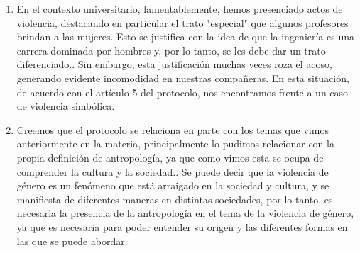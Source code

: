 \documentclass[12pt, a4paper]{article}
\begin{document}
\begin{enumerate}
      \item En el contexto universitario, lamentablemente, hemos presenciado actos de violencia, destacando en particular el trato "especial" que algunos profesores brindan a las mujeres. Esto se justifica con la idea de que la ingeniería es una carrera dominada por hombres y, por lo tanto, se les debe dar un trato diferenciado.. Sin embargo, esta justificación muchas veces roza el acoso, generando evidente incomodidad en nuestras compañeras. En esta situación, de acuerdo con el artículo 5 del protocolo, nos encontramos frente a un caso de violencia simbólica.

      \item Creemos que el protocolo se relaciona en parte con los temas que vimos anteriormente en la materia, principalmente lo pudimos relacionar con la propia definición de antropología, ya que como vimos esta se ocupa de comprender la cultura y la sociedad.. Se puede decir que la violencia de género es un fenómeno que está arraigado en la sociedad y cultura, y se manifiesta de diferentes maneras en distintas sociedades, por lo tanto, es necesaria la presencia de la antropología en el tema de la violencia de género, ya que es necesaria para poder entender su origen y las diferentes formas en las que se puede abordar.

    \end{enumerate}
    
\end{document}
